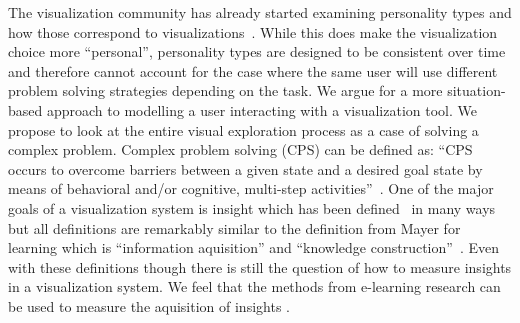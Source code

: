 
The visualization community has already started examining personality types and
how those correspond to visualizations~\citep{Conati:2014}. While this does
make the visualization choice more ``personal'', personality types are designed
to be consistent over time and therefore cannot account for the case where the
same user will use different problem solving strategies depending on the task.
We argue for a more situation-based approach to modelling a user interacting
with a visualization tool. We propose to look at the entire visual exploration
process as a case of solving a complex problem. Complex problem solving (CPS) can be
defined as: ``CPS occurs to overcome barriers between a given state and a
desired goal state by means of behavioral and/or cognitive, multi-step
activities''~\citep{Frensch:2005}. One of the major goals of a visualization
system is insight which has been defined~\citep{Yi:2008a} in many ways but all
definitions are remarkably similar to the definition from Mayer for learning
which is ``information aquisition'' and ``knowledge
construction''~\citep{Mayer:2009}. Even with these definitions though there is
still the question of how to measure insights in a visualization system. We
feel that the methods from e-learning research can be used to measure the
aquisition of insights  
. 

